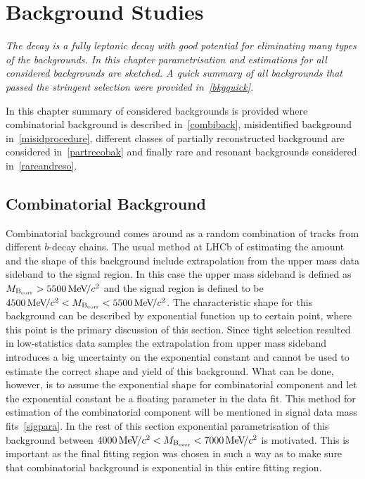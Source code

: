 \chapter{Background Studies}
\label{chap:back}

\textit{The decay \Bmumumu is a fully leptonic decay with good potential for eliminating many types of the backgrounds. In this chapter parametrisation and estimations for all considered backgrounds are sketched. A quick summary of all backgrounds that passed the stringent selection were provided in~\autoref{bkgquick}.}

In this chapter summary of considered backgrounds is provided where combinatorial background is described in~\autoref{combiback}, misidentified background in~\autoref{misidprocedure}, different classes of partially reconstructed background are considered in~\autoref{partrecobak} and finally rare and resonant backgrounds considered in~\autoref{rareandreso}.

\section{Combinatorial Background}
\label{combiback}
Combinatorial background comes around as a random combination of tracks from different $b$-decay chains. The usual method at \gls{LHCb} of estimating the amount and the shape of this background include extrapolation from the upper mass data sideband to the signal region. In this case the upper mass sideband is defined as $M_{\rm{B_{corr}}} > 5500 {\mathrm{\,Me\kern -0.1em V\!/}c^2}$ and the signal region is defined to be $ 4500 {\mathrm{\,Me\kern -0.1em V\!/}c^2} <M_{\rm{B_{corr}}} < 5500 {\mathrm{\,Me\kern -0.1em V\!/}c^2}$. The characteristic shape for this background can be described by exponential function up to certain point, where this point is the primary discussion of this section. Since tight selection resulted in low-statistics data samples the extrapolation from upper mass sideband introduces a big uncertainty on the exponential constant and cannot be used to estimate the correct shape and yield of this background. What can be done, however, is to assume the exponential shape for combinatorial component and let the exponential constant be a floating parameter in the data fit. This method for estimation of the combinatorial component will be mentioned in signal data mass fits~\autoref{sigpara}. In the rest of this section exponential parametrisation of this background between $4000 {\mathrm{\,Me\kern -0.1em V\!/}c^2} <M_{\rm{B_{corr}}} < 7000 {\mathrm{\,Me\kern -0.1em V\!/}c^2}$ is motivated. This is important as the final fitting region was chosen in such a way as to make sure that combinatorial background is exponential in this entire fitting region. 


